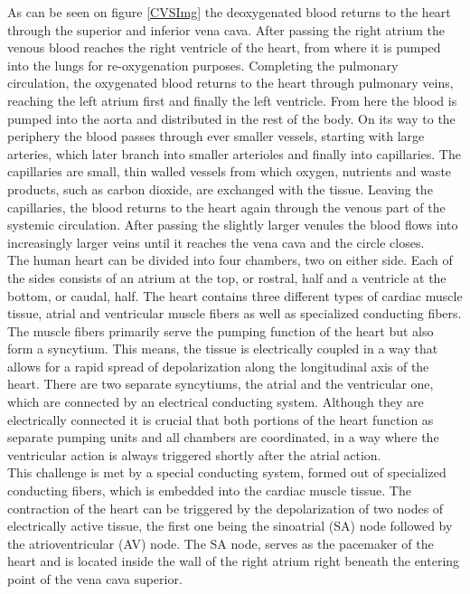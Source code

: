 As can be seen on figure \ref{CVSImg} the deoxygenated blood returns to the heart through the superior and inferior vena cava. After passing the right atrium the venous blood reaches the right ventricle of the heart, from where it is pumped into the lungs for re-oxygenation purposes. Completing the pulmonary circulation, the oxygenated blood returns to the heart through pulmonary veins, reaching the left atrium first and finally the left ventricle. From here the blood is pumped into the aorta and distributed in the rest of the body. On its way to the periphery the blood passes through ever smaller vessels, starting with large arteries, which later branch into smaller arterioles and finally into capillaries. The capillaries are small, thin walled vessels from which oxygen, nutrients and waste products, such as carbon dioxide, are exchanged with the tissue. Leaving the capillaries, the blood returns to the heart again through the venous part of the systemic circulation. After passing the slightly larger venules the blood flows into increasingly larger veins until it reaches the vena cava and the circle closes.\\
The human heart can be divided into four chambers, two on either side. Each of the sides consists of an atrium at the top, or rostral, half and a ventricle at the bottom, or caudal, half. The heart contains three different types of cardiac muscle tissue, atrial and ventricular muscle fibers as well as specialized conducting fibers. The muscle fibers primarily serve the pumping function of the heart but also form a syncytium. This means, the tissue is electrically coupled in a way that allows for a rapid spread of depolarization along the longitudinal axis of the heart. There are two separate syncytiums, the atrial and the ventricular one, which are connected by an electrical conducting system. Although they are electrically connected it is crucial that both portions of the heart function as separate pumping units and all chambers are coordinated, in a way where the ventricular action is always triggered shortly after the atrial action.\\
This challenge is met by a special conducting system, formed out of specialized conducting fibers, which is embedded into the cardiac muscle tissue. The contraction of the heart can be triggered by the depolarization of two nodes of electrically active tissue, the first one being the sinoatrial (SA) node followed by the atrioventricular (AV) node. The SA node, serves as the pacemaker of the heart and is located inside the wall of the right atrium right beneath the entering point of the vena cava superior.  

